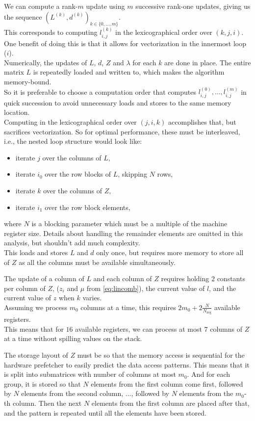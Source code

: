 \documentclass{article}
\begin{document}
We can compute a rank-$m$ update using $m$ successive rank-one updates, giving us the sequence $(L^{(k)}, d^{(k)})_{k\in \{0,\dots, m\}}$.\\
This corresponds to computing $l_{i, j}^{(k)}$ in the lexicographical order over $(k, j, i)$.\\
One benefit of doing this is that it allows for vectorization in the innermost loop ($i$).\\
Numerically, the updates of $L$, $d$, $Z$ and $\lambda$ for each $k$ are done in place.
The entire matrix $L$ is repeatedly loaded and written to, which makes the algorithm memory-bound.\\
So it is preferable to choose a computation order that computes $l_{i, j}^{(0)},\dots, l_{i, j}^{(m)}$ in quick succession to avoid unnecessary loads and stores to the same memory location.\\
Computing in the lexicographical order over $(j, i, k)$ accomplishes that, but sacrifices vectorization. So for optimal performance, these must be interleaved, i.e., the nested loop structure would look like:
\begin{itemize}
	\item iterate $j$ over the columns of $L$,
	\item iterate $i_0$ over the row blocks of $L$, skipping $N$ rows,
	\item iterate $k$ over the columns of $Z$,
	\item iterate $i_1$ over the row block elements,
\end{itemize}
where $N$ is a blocking parameter which must be a multiple of the machine register size.
Details about handling the remainder elements are omitted in this analysis, but shouldn't add much complexity.\\
This loads and stores $L$ and $d$ only once, but requires more memory to store all of $Z$ as all the columns must be available simultaneously.

The update of a column of $L$ and each column of $Z$ requires holding $2$
constants per column of $Z$, ($z_i$ and $\mu$ from \ref{eq:lincomb}), the current value of $l$, and the current value of $z$ when $k$ varies.\\
Assuming we process $m_0$ columns at a time, this requires $2m_0 + 2\frac{N}{N_{\text{reg}}}$ available registers.\\
This means that for $16$ available registers, we can process at most 7 columns of $Z$ at a time without spilling values on the stack.

The storage layout of $Z$ must be so that the memory access is sequential for the hardware prefetcher to easily predict the data access patterns.
This means that it is split into submatrices with number of columns at most $m_0$.
And for each group, it is stored so that $N$ elements from the first column come first, followed by $N$ elements from the second column, $\dots$, followed by $N$ elements from the $m_0$-th column.
Then the next $N$ elements from the first column are placed after that, and the pattern is repeated until all the elements have been stored.
\end{document}
